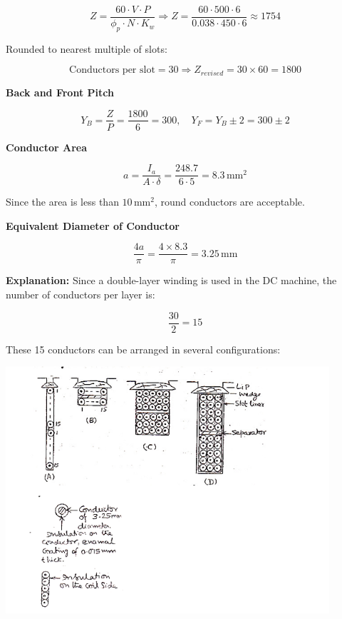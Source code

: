 \documentclass[12pt]{article}
\begin{document}
\[
Z = \frac{60 \cdot V \cdot P}{\phi_p \cdot N \cdot K_w}
\Rightarrow Z = \frac{60 \cdot 500 \cdot 6}{0.038 \cdot 450 \cdot 6} \approx 1754
\]

Rounded to nearest multiple of slots:

\[
\text{Conductors per slot} = 30 \Rightarrow Z_{revised} = 30 \times 60 = 1800
\]

\vspace{5pt}

\noindent
\textbf{Back and Front Pitch}

\[
Y_B = \frac{Z}{P} = \frac{1800}{6} = 300, \quad Y_F = Y_B \pm 2 = 300 \pm 2
\]

\vspace{5pt}

\noindent
\textbf{Conductor Area}

\[
a = \frac{I_a}{A \cdot \delta} = \frac{248.7}{6 \cdot 5} = 8.3\, \text{mm}^2
\]

Since the area is less than $10\, \text{mm}^2$, round conductors are acceptable.

\vspace{10pt}

\noindent




\vspace{10pt}

\noindent
\textbf{Equivalent Diameter of Conductor}

\[
\frac{4a}{\pi} = \frac{4 \times 8.3}{\pi} = 3.25\, \text{mm}
\]

\vspace{5pt}

\noindent
\textbf{Explanation:} Since a double-layer winding is used in the DC machine, the number of conductors per layer is:

\[
\frac{30}{2} = 15
\]

These 15 conductors can be arranged in several configurations:

\begin{center}
	\includegraphics[width=0.9\textwidth]{images/image1}
\end{center}
\end{document}
